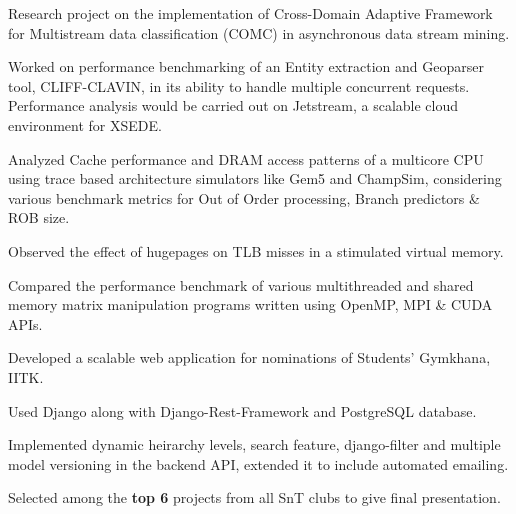 \documentclass[]{deedy-resume-openfont}
\begin{document}
\begin{minipage}[t]{0.70\textwidth}
\vspace{0.1cm}
\vspace{0cm} %
\begin{tightemize}
  \item Research project on the implementation of Cross-Domain Adaptive Framework for Multistream data classification (COMC) in asynchronous data stream mining.
  \item Worked on performance benchmarking of an Entity extraction and Geoparser tool, CLIFF-CLAVIN, in its ability to handle multiple concurrent requests. Performance analysis would be carried out on Jetstream, a scalable cloud environment for XSEDE.
\end{tightemize}

\vspace{0.1cm}
\vspace{0cm} %
\begin{tightemize}
\item Analyzed Cache performance and DRAM access patterns of a multicore CPU using trace based architecture simulators like Gem5 and ChampSim, considering various benchmark metrics for Out of Order processing, Branch predictors \& ROB size.
  \item Observed the effect of hugepages on TLB misses in a stimulated virtual memory.
  \item Compared the performance benchmark of various multithreaded and shared memory matrix manipulation programs written using OpenMP, MPI \& CUDA APIs.
\end{tightemize}

\vspace{0.1cm}
\vspace{0cm} %
\begin{tightemize}
  \item Developed a scalable web application for nominations of Students' Gymkhana, IITK.
  \item Used Django along with Django-Rest-Framework and PostgreSQL database.
  \item	Implemented dynamic heirarchy levels, search feature, django-filter and multiple model versioning in the backend API, extended it to include automated emailing.
  \item	Selected among the \textbf{top 6} projects from all SnT clubs to give final presentation.
\end{tightemize}


\end{minipage}
\end{document}
